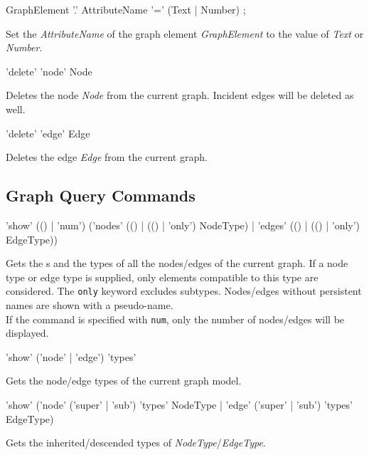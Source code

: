 \begin{rail}
  GraphElement '.' AttributeName '=' (Text | Number) ;
\end{rail}
Set the  \emph{AttributeName} of the graph element \emph{GraphElement} to the value of \emph{Text} or \emph{Number}.

\begin{rail}
  'delete' 'node' Node
\end{rail}
Deletes the node \emph{Node} from the current graph. Incident edges will be deleted as well.

\begin{rail}
  'delete' 'edge' Edge
\end{rail}
Deletes the edge \emph{Edge} from the current graph.
  
\subsection{Graph Query Commands}

\begin{rail}
  'show' (() | 'num') ('nodes' (() | (() | 'only') NodeType) | 'edges' (() | (() | 'only') EdgeType))
\end{rail}
Gets the s and the types of all the nodes/edges of the current graph. If a node type or edge type is supplied, only elements compatible to this type are considered. The \texttt{only} keyword excludes subtypes. Nodes/edges without persistent names are shown with a pseudo-name.\\
If the command is specified with \texttt{num}, only the number of nodes/edges will be displayed.

\begin{rail}
  'show' ('node' | 'edge') 'types'
\end{rail}
Gets the node/edge types of the current graph model.

\begin{rail}
'show' ('node' ('super' | 'sub') 'types' NodeType | 'edge' ('super' | 'sub') 'types' EdgeType)
\end{rail}
Gets the inherited/descended types of \emph{NodeType}/\emph{EdgeType}.

